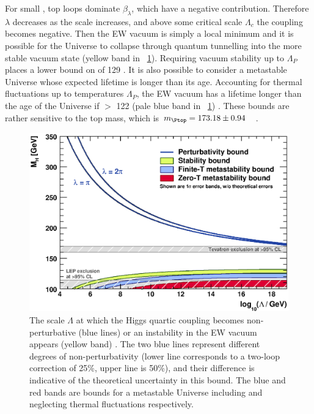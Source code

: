 For small \mH, top loops dominate $\beta_{\lambda}$, which have a negative 
contribution. Therefore $\lambda$ decreases as the scale increases, and above some 
critical scale $\Lambda_c$ the coupling becomes negative. Then the \ac{EW} 
vacuum is simply a local minimum and it is possible for the Universe to collapse through
quantum tunnelling into the more stable vacuum state (yellow band in 
\Figure~\ref{fig:theory_constraints}). Requiring vacuum stability up to $\Lambda_{P}$ 
places a lower bound on \mH of \unit{129}{\GeV} \cite{Ellis:2009}. It is also possible 
to consider a metastable Universe whose expected lifetime is longer than its age.
Accounting for thermal fluctuations up to temperatures \about $\Lambda_{P}$, the \ac{EW}
vacuum has a lifetime longer than the age of the Universe if \mH $>$ \unit{122}{\GeV} 
(pale blue band in \Figure~\ref{fig:theory_constraints}) \cite{Ellis:2009}. These bounds 
are rather sensitive to the top mass, which is 
\unit{$m_{\Ptop} = 173.18 \pm 0.94$}{\GeV} \cite{TopMass}.

\begin{figure}
	\includegraphics[width=\mediumfigwidth]{tex/motivation/theory_constraints}
	\caption{The scale $\Lambda$ at which the Higgs quartic coupling becomes 
	non-perturbative (blue lines) or an instability in the \ac{EW} vacuum appears
	(yellow band) \cite{Ellis:2009}. The two blue lines represent different degrees of 
	non-perturbativity (lower line corresponds to a two-loop correction of 25\%, upper 
	line is 50\%), and their difference is indicative of the theoretical uncertainty in 
	this bound. The blue and red bands are bounds for a metastable Universe including and
	neglecting thermal fluctuations respectively.}
	\label{fig:theory_constraints}
\end{figure}
